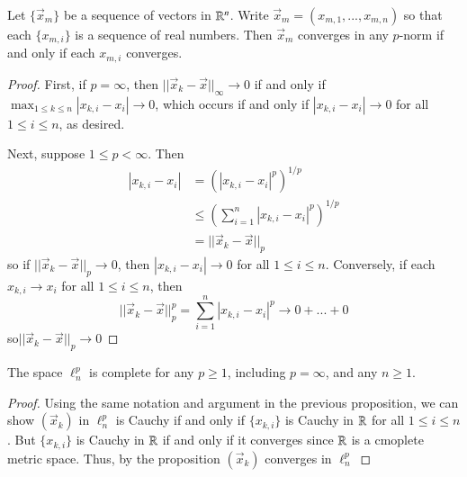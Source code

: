 \begin{theorem}
    Let $\{\vec{x}_m\}$ be a sequence of vectors in $\mathbb R^n$. Write $\vec{x}_m = (x_{m,1},...,x_{m,n})$ so that each $\{x_{m,i}\}$ is a sequence of real numbers. Then $\vec{x}_m$ converges in any $p$-norm if and only if each $x_{m,i}$ converges.
\end{theorem}
\begin{proof}
    First, if $p = \infty$, then $||\vec{x}_k-\vec{x}||_{\infty}\rightarrow 0$ if and only if $\max_{1\leq k \leq n}|x_{k,i}-x_i|\rightarrow 0$, which occurs if and only if $|x_{k,i}-x_i| \rightarrow 0$ for all $1 \leq i \leq n$, as desired.

    Next, suppose $1 \leq p < \infty$. Then \begin{align*}
        |x_{k,i} - x_i| &= (|x_{k,i}-x_i|^p)^{1/p} \\
        &\leq \left(\sum_{i=1}^n|x_{k,i} - x_i|^p\right)^{1/p} \\
        &= ||\vec{x}_k - \vec{x}||_p
    \end{align*}
    so if $||\vec{x}_k-\vec{x}||_p\rightarrow 0$, then $|x_{k,i} - x_i|\rightarrow 0$ for all $1 \leq i \leq n$. Conversely, if each $x_{k,i}\rightarrow x_i$ for all $1 \leq i \leq n$, then $$||\vec{x}_k-\vec{x}||_p^p = \sum_{i=1}^n|x_{k,i}-x_i|^p \rightarrow 0+...+0$$ so$ ||\vec{x}_k-\vec{x}||_p\rightarrow 0$
\end{proof}

\begin{corollary}
    The space $\ell_n^p$ is complete for any $p \geq 1$, including $p = \infty$, and any $n \geq 1$.
\end{corollary}
\begin{proof}
    Using the same notation and argument in the previous proposition, we can show $(\vec{x}_k)$ in $\ell_n^p$ is Cauchy if and only if $\{x_{k,i}\}$ is Cauchy in $\mathbb R$ for all $1 \leq i \leq n$. But $\{x_{k,i}\}$ is Cauchy in $\mathbb R$ if and only if it converges since $\mathbb R$ is a cmoplete metric space. Thus, by the proposition $(\vec{x}_k)$ converges in $\ell_n^p$
\end{proof}


